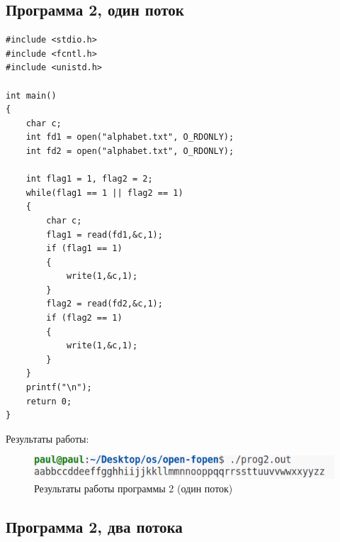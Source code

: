 \clearpage

\subsection*{Программа 2, один поток}

\begin{center}
	\captionsetup{justification=raggedright,singlelinecheck=off}

	\begin{lstlisting}[label=lst:prog2,caption=Программа 2 --- один поток]
#include <stdio.h>
#include <fcntl.h>
#include <unistd.h>

int main()
{
    char c;    
    int fd1 = open("alphabet.txt", O_RDONLY);
    int fd2 = open("alphabet.txt", O_RDONLY);

    int flag1 = 1, flag2 = 2;
    while(flag1 == 1 || flag2 == 1)
    {
        char c;
        flag1 = read(fd1,&c,1);
        if (flag1 == 1) 
        {
            write(1,&c,1);
        }
        flag2 = read(fd2,&c,1);
        if (flag2 == 1) 
        { 
            write(1,&c,1);
        }
    }
    printf("\n");
    return 0;
}
	\end{lstlisting}
\end{center}

Результаты работы:

\begin{figure}[h]
	\centering
	\captionsetup{justification=centering}
	\includegraphics[width=150mm]{img/prog2.png}
	\caption{Результаты работы программы 2 (один поток)}
	\label{fig:prog-2-result}
\end{figure}

\clearpage

\subsection{Программа 2, два потока}

